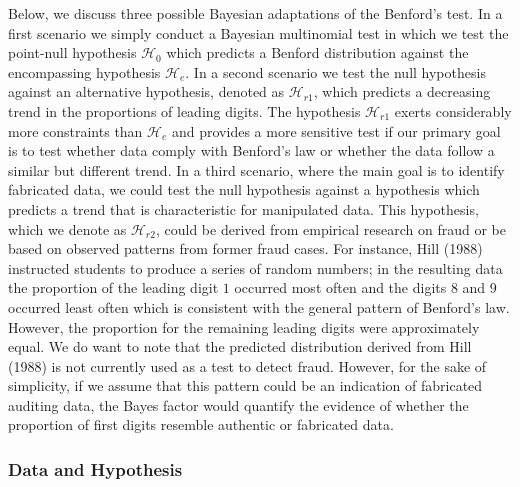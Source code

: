 \documentclass[
  english,
  man,floatsintext]{apa6}
\begin{document}
Below, we discuss three possible Bayesian adaptations of the Benford's test. In a first scenario we simply conduct a Bayesian multinomial test in which we test the point-null hypothesis \(\mathcal{H}_0\) which predicts a Benford distribution against the encompassing hypothesis \(\mathcal{H}_{e}\). In a second scenario we test the null hypothesis against an alternative hypothesis, denoted as \(\mathcal{H}_{r1}\), which predicts a decreasing trend in the proportions of leading digits. The hypothesis \(\mathcal{H}_{r1}\) exerts considerably more constraints than \(\mathcal{H}_{e}\) and provides a more sensitive test if our primary goal is to test whether data comply with Benford's law or whether the data follow a similar but different trend. In a third scenario, where the main goal is to identify fabricated data, we could test the null hypothesis against a hypothesis which predicts a trend that is characteristic for manipulated data. This hypothesis, which we denote as \(\mathcal{H}_{r2}\), could be derived from empirical research on fraud or be based on observed patterns from former fraud cases. For instance, Hill (1988) instructed students to produce a series of random numbers; in the resulting data the proportion of the leading digit \(1\) occurred most often and the digits \(8\) and \(9\) occurred least often which is consistent with the general pattern of Benford's law. However, the proportion for the remaining leading digits were approximately equal. We do want to note that the predicted distribution derived from Hill (1988) is not currently used as a test to detect fraud. However, for the sake of simplicity, if we assume that this pattern could be an indication of fabricated auditing data, the Bayes factor would quantify the evidence of whether the proportion of first digits resemble authentic or fabricated data.

\hypertarget{data-and-hypothesis}{%
\subsubsection{Data and Hypothesis}\label{data-and-hypothesis}}
\end{document}
